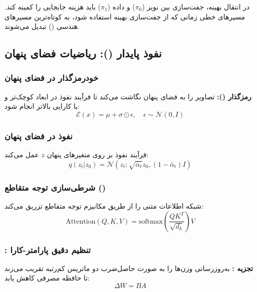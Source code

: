 \begin{latin}
در انتقال بهینه، جفت‌سازی بین نویز ($\pi_0$) و داده ($\pi_1$) باید هزینه جابجایی را کمینه کند. مسیرهای خطی زمانی که از جفت‌سازی بهینه استفاده شود، به کوتاه‌ترین مسیرهای هندسی () تبدیل می‌شوند.

\subsection{نفوذ پایدار (): ریاضیات فضای پنهان}

\subsubsection{خودرمزگذار  در فضای پنهان}

\textbf{رمزگذار ():} تصاویر را به فضای پنهان نگاشت می‌کند تا فرآیند نفوذ در ابعاد کوچک‌تر و با کارایی بالاتر انجام شود:
\begin{equation}
\mathcal{E}(x) = \mu + \sigma \odot \epsilon, \quad \epsilon \sim \mathcal{N}(0, I)
\end{equation}



\subsubsection{نفوذ در فضای پنهان}

فرآیند نفوذ بر روی متغیرهای پنهان $z$ عمل می‌کند:
\begin{equation}
q(z_t | z_0) = \mathcal{N}(z_t; \sqrt{\bar{\alpha}_t} z_0, (1 - \bar{\alpha}_t) I)
\end{equation}

\subsubsection{شرطی‌سازی توجه متقاطع ()}

شبکه  اطلاعات متنی را از طریق مکانیزم توجه متقاطع تزریق می‌کند:
\begin{equation}
\text{Attention}(Q, K, V) = \text{softmax}\left(\frac{QK^T}{\sqrt{d_k}}\right) V
\end{equation}



\subsubsection{: تنظیم دقیق پارامتر-کارا}

\textbf{تجزیه :} به‌روزرسانی وزن‌ها را به صورت حاصل‌ضرب دو ماتریس کم‌رتبه تقریب می‌زند تا حافظه مصرفی کاهش یابد:
\begin{equation}
\Delta W = BA
\end{equation}


\end{latin}
